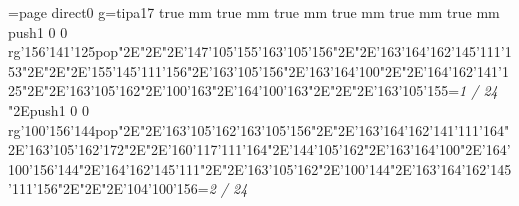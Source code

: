 \chardef\match=\pdfcolorstackinit page direct{0 g}\nopagenumbers\font\ipa=tipa17 true mm true mm true mm true mm true mm true mm
\null\vfill\pdfcolorstack\match push{1 0 0 rg}\ipa\char'156\ipa\char'141\ipa\char'125\pdfcolorstack\match pop{}\ipa\char"2E\enskip\enskip\enskip\ipa\char"2E\enskip\ipa\char"2E\ipa\char'147\ipa\char'105\ipa\char'155\bigskip\ipa\char'163\ipa\char'105\ipa\char'156\ipa\char"2E\enskip\enskip\enskip\ipa\char"2E\ipa\char'163\ipa\char'164\ipa\char'162\ipa\char'145\ipa\char'111\ipa\char'153\bigskip\enskip\enskip\ipa\char"2E\enskip\enskip\enskip\enskip\ipa\char"2E\enskip\ipa\char"2E\ipa\char'155\ipa\char'145\ipa\char'111\ipa\char'156\ipa\char"2E\ipa\char'163\ipa\char'105\ipa\char'156\ipa\char"2E\ipa\char'163\ipa\char'164\ipa\char'100\ipa\char"2E\enskip\enskip\enskip\enskip\bigskip\enskip\ipa\char"2E\ipa\char'164\ipa\char'162\ipa\char'141\ipa\char'125\ipa\char"2E\enskip\enskip\ipa\char"2E\ipa\char'163\ipa\char'105\ipa\char'162\ipa\char"2E\ipa\char'100\ipa\char'163\ipa\char"2E\enskip\enskip\enskip\enskip\enskip\enskip\bigskip\ipa\char'164\ipa\char'100\ipa\char'163\ipa\char"2E\enskip\enskip\ipa\char"2E\enskip\enskip\enskip\ipa\char"2E\ipa\char'163\ipa\char'105\ipa\char'155\bigskip\vfill\footline={\hfill\tenrm\it 1 / 24}\eject
\null\vfill\enskip\enskip\enskip\ipa\char"2E\pdfcolorstack\match push{1 0 0 rg}\ipa\char'100\ipa\char'156\ipa\char'144\pdfcolorstack\match pop{}\ipa\char"2E\enskip\ipa\char"2E\ipa\char'163\ipa\char'105\ipa\char'162\bigskip\ipa\char'163\ipa\char'105\ipa\char'156\ipa\char"2E\enskip\enskip\enskip\ipa\char"2E\ipa\char'163\ipa\char'164\ipa\char'162\ipa\char'141\ipa\char'111\ipa\char'164\bigskip\enskip\enskip\ipa\char"2E\ipa\char'163\ipa\char'105\ipa\char'162\ipa\char'172\ipa\char"2E\enskip\ipa\char"2E\ipa\char'160\ipa\char'117\ipa\char'111\ipa\char'164\ipa\char"2E\ipa\char'144\ipa\char'105\ipa\char'162\ipa\char"2E\ipa\char'163\ipa\char'164\ipa\char'100\ipa\char"2E\ipa\char'164\ipa\char'100\ipa\char'156\ipa\char'144\bigskip\enskip\ipa\char"2E\ipa\char'164\ipa\char'162\ipa\char'145\ipa\char'111\ipa\char"2E\enskip\enskip\ipa\char"2E\ipa\char'163\ipa\char'105\ipa\char'162\ipa\char"2E\ipa\char'100\ipa\char'144\ipa\char"2E\ipa\char'163\ipa\char'164\ipa\char'162\ipa\char'145\ipa\char'111\ipa\char'156\bigskip\enskip\enskip\enskip\ipa\char"2E\enskip\enskip\ipa\char"2E\enskip\enskip\enskip\ipa\char"2E\ipa\char'104\ipa\char'100\ipa\char'156\bigskip\vfill\footline={\hfill\tenrm\it 2 / 24}\eject
